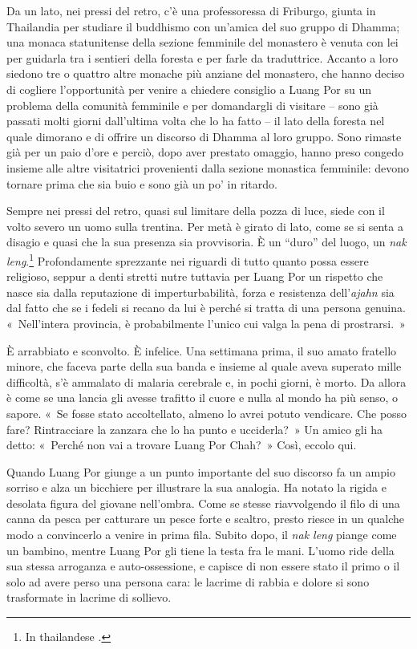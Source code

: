 Da un lato, nei pressi del retro, c'è una professoressa di Friburgo,
giunta in Thailandia per studiare il buddhismo con un'amica del suo
gruppo di Dhamma; una monaca statunitense della sezione femminile del
monastero è venuta con lei per guidarla tra i sentieri della foresta e
per farle da traduttrice. Accanto a loro siedono tre o quattro altre
monache più anziane del monastero, che hanno deciso di cogliere
l'opportunità per venire a chiedere consiglio a Luang Por su un problema
della comunità femminile e per domandargli di visitare -- sono già
passati molti giorni dall'ultima volta che lo ha fatto -- il lato della
foresta nel quale dimorano e di offrire un discorso di Dhamma al loro
gruppo. Sono rimaste già per un paio d'ore e perciò, dopo aver prestato
omaggio, hanno preso congedo insieme alle altre visitatrici provenienti
dalla sezione monastica femminile: devono tornare prima che sia buio e
sono già un po' in ritardo.

Sempre nei pressi del retro, quasi sul limitare della pozza di luce,
siede con il volto severo un uomo sulla trentina. Per metà è girato di
lato, come se si senta a disagio e quasi che la sua presenza sia
provvisoria. È un ``duro'' del luogo, un \emph{nak leng}.\footnote{In
  thailandese .} Profondamente sprezzante nei riguardi di tutto
quanto possa essere religioso, seppur a denti stretti nutre tuttavia per
Luang Por un rispetto che nasce sia dalla reputazione di
imperturbabilità, forza e resistenza dell'\emph{ajahn} sia dal fatto che
se i fedeli si recano da lui è perché si tratta di una persona genuina.
«~Nell'intera provincia, è probabilmente l'unico cui valga la pena di
prostrarsi.~»

È arrabbiato e sconvolto. È infelice. Una settimana prima, il suo amato
fratello minore, che faceva parte della sua banda e insieme al quale
aveva superato mille difficoltà, s'è ammalato di malaria cerebrale e, in
pochi giorni, è morto. Da allora è come se una lancia gli avesse
trafitto il cuore e nulla al mondo ha più senso, o sapore. «~Se fosse
stato accoltellato, almeno lo avrei potuto vendicare. Che posso fare?
Rintracciare la zanzara che lo ha punto e ucciderla?~» Un amico gli ha
detto: «~Perché non vai a trovare Luang Por Chah?~» Così, eccolo qui.

Quando Luang Por giunge a un punto importante del suo discorso fa un
ampio sorriso e alza un bicchiere per illustrare la sua analogia. Ha
notato la rigida e desolata figura del giovane nell'ombra. Come se
stesse riavvolgendo il filo di una canna da pesca per catturare un pesce
forte e scaltro, presto riesce in un qualche modo a convincerlo a venire
in prima fila. Subito dopo, il \emph{nak leng} piange come un bambino,
mentre Luang Por gli tiene la testa fra le mani. L'uomo ride della sua
stessa arroganza e auto-ossessione, e capisce di non essere stato il
primo o il solo ad avere perso una persona cara: le lacrime di rabbia e
dolore si sono trasformate in lacrime di sollievo.

